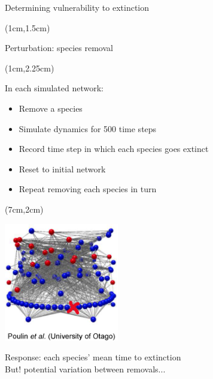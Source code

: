 \documentclass{beamer}
\newcommand*\whitem{%
  \item[\color{white}\scalebox{0.9}{\textbullet}]}
\begin{document}
  \begin{frame}{Determining vulnerability to extinction}

    \begin{textblock*}{7cm}(1cm,1.5cm)

      {\color{DarkBlue}Perturbation: species removal}

    \end{textblock*}

    \begin{textblock*}{5cm}(1cm,2.25cm)

      {\color{white}In each simulated network:}

      \begin{itemize}
        \whitem {\color{white}Remove a species}
        \whitem {\color{white}Simulate dynamics for 500 time steps}
        \whitem {\color{white}Record time step in which each species goes extinct}
        \whitem {\color{white}Reset to initial network}
        \whitem {\color{white}Repeat removing each species in turn}

      \end{itemize}

      \end{textblock*}

    \begin{textblock*}{5cm}(7cm,2cm)

      \includegraphics[width=5cm]{intro_figs/Otagoweb_remove3.eps}

      \end{textblock*}

    {\color{white} Response: each species' mean time to extinction\\
    But! potential variation between removals...}

    \end{frame}
\end{document}
